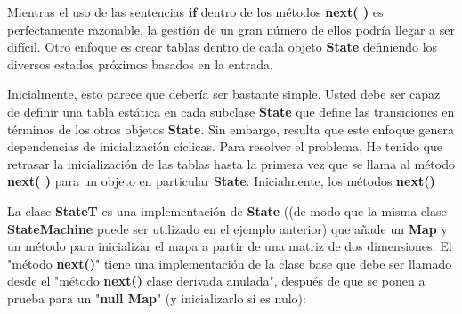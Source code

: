 \documentclass{article}
\begin{document}
  Mientras el uso de las sentencias \textbf{if} dentro de los métodos \textbf{next( )} es perfectamente razonable, la gestión de un gran número de ellos podría llegar a ser difícil. Otro enfoque es crear tablas dentro de cada objeto \textbf{State} definiendo los diversos estados próximos basados en la entrada.    \newline
  
  Inicialmente, esto parece que debería ser bastante simple. Usted debe ser capaz de definir una tabla estática en cada subclase \textbf{State} que define las transiciones en términos de los otros objetos \textbf{State}. Sin embargo, resulta que este enfoque genera dependencias de inicialización cíclicas. Para resolver el problema, He tenido que retrasar la inicialización de las tablas hasta la primera vez que se llama al método  \textbf{next( )} para un objeto en particular \textbf{State}. Inicialmente, los métodos \textbf{next()}\newline
  
  La clase \textbf{StateT} es una implementación de \textbf{State} ((de modo que la misma clase \textbf{StateMachine} puede ser utilizado en el ejemplo anterior) que añade un \textbf{Map} y un método para inicializar el mapa a partir de una matriz de dos dimensiones. El "método \textbf{next()}" tiene una implementación de la clase base que debe ser llamado desde el "método \textbf{next()} clase derivada anulada", después de que se ponen a prueba para un "\textbf{null Map}" (y inicializarlo si es nulo):  \newline
  
\end{document}
